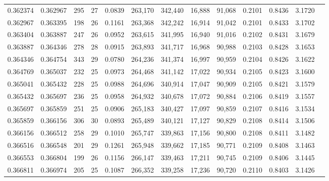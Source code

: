 \begin{tabular}{rrrrrrrrrrrrr}
0.362374 & 0.362967 &   295 &  27 &                                     0.0839 & 263,170 & 342,440 &  16,888 &  91,068 & 0.2101 & 0.8436 & 3.1720 \\
0.362967 & 0.363395 &   198 &  26 &                                     0.1161 & 263,368 & 342,242 &  16,914 &  91,042 & 0.2101 & 0.8433 & 3.1702 \\
0.363404 & 0.363887 &   247 &  26 &                                     0.0952 & 263,615 & 341,995 &  16,940 &  91,016 & 0.2102 & 0.8431 & 3.1679 \\
0.363887 & 0.364346 &   278 &  28 &                                     0.0915 & 263,893 & 341,717 &  16,968 &  90,988 & 0.2103 & 0.8428 & 3.1653 \\
0.364346 & 0.364754 &   343 &  29 &                                     0.0780 & 264,236 & 341,374 &  16,997 &  90,959 & 0.2104 & 0.8426 & 3.1622 \\
0.364769 & 0.365037 &   232 &  25 &                                     0.0973 & 264,468 & 341,142 &  17,022 &  90,934 & 0.2105 & 0.8423 & 3.1600 \\
0.365041 & 0.365432 &   228 &  25 &                                     0.0988 & 264,696 & 340,914 &  17,047 &  90,909 & 0.2105 & 0.8421 & 3.1579 \\
0.365432 & 0.365697 &   236 &  25 &                                     0.0958 & 264,932 & 340,678 &  17,072 &  90,884 & 0.2106 & 0.8419 & 3.1557 \\
0.365697 & 0.365859 &   251 &  25 &                                     0.0906 & 265,183 & 340,427 &  17,097 &  90,859 & 0.2107 & 0.8416 & 3.1534 \\
0.365859 & 0.366156 &   306 &  30 &                                     0.0893 & 265,489 & 340,121 &  17,127 &  90,829 & 0.2108 & 0.8414 & 3.1506 \\
0.366156 & 0.366512 &   258 &  29 &                                     0.1010 & 265,747 & 339,863 &  17,156 &  90,800 & 0.2108 & 0.8411 & 3.1482 \\
0.366516 & 0.366548 &   201 &  29 &                                     0.1261 & 265,948 & 339,662 &  17,185 &  90,771 & 0.2109 & 0.8408 & 3.1463 \\
0.366553 & 0.366804 &   199 &  26 &                                     0.1156 & 266,147 & 339,463 &  17,211 &  90,745 & 0.2109 & 0.8406 & 3.1445 \\
0.366811 & 0.366974 &   205 &  25 &                                     0.1087 & 266,352 & 339,258 &  17,236 &  90,720 & 0.2110 & 0.8403 & 3.1426 \\

\end{tabular}
